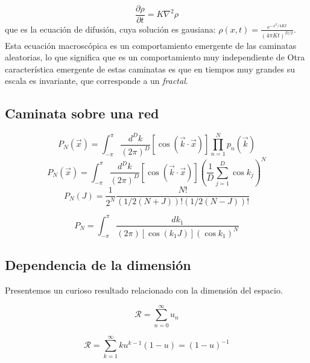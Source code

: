 \begin{equation}
    \frac{\partial\rho}{\partial t}=K\nabla^2\rho
    \end{equation}{}
que es la ecuación de difusión, cuya solución es gausiana: $\rho(x,t)=\frac{e^{-x^2/4Kt}}{(4\pi Kt)^{D/2}}$. Esta ecuación macroscópica es un comportamiento emergente de las caminatas aleatorias, lo que significa que es un comportamiento muy independiente de  Otra característica emergente de estas caminatas es que en tiempos muy grandes su escala es invariante, que corresponde a un \textit{fractal}.

\subsection{Caminata sobre una red}
\begin{equation}
    P_N(\Vec{x})=\int_{-\pi}^\pi\frac{d^Dk}{(2\pi)^D}[\cos{(\Vec{k}\cdot\Vec{x})}]\prod_{n=1}^{N}p_n(\Vec{k})
\end{equation}{}
\begin{equation}
    P_N(\Vec{x})=\int_{-\pi}^\pi\frac{d^Dk}{(2\pi)^D}[\cos(\Vec{k}\cdot\Vec{x})]\left(\frac{1}{D}\sum_{j=1}^D\cos{k_j}\right)^N
\end{equation}{}
\begin{equation}
    P_N(J)=\frac{1}{2^N}\frac{N!}{(1/2(N+J))!(1/2(N-J))!}
\end{equation}{}

\begin{equation}
    P_N=\int_{-\pi}^\pi\frac{dk_1}{(2\pi)[\cos{(k_1J)}](\cos{k_1})^N}
\end{equation}{}
\subsection{Dependencia de la dimensión}
Presentemos un curioso resultado relacionado con la dimensión del espacio. 

\begin{equation}
    \mathcal{R}=\sum_{n=0}^\infty u_n
\end{equation}{}

\begin{equation}
    \mathcal{R}=\sum_{k=1}^\infty ku^{k-1}(1-u)=(1-u)^{-1}
\end{equation}{}

